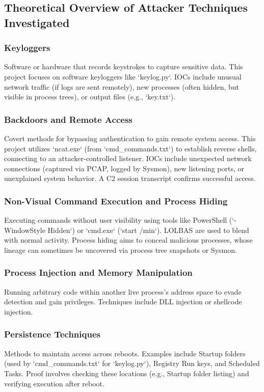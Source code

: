\documentclass[11pt]{article}
\begin{document}
	\subsection{Theoretical Overview of Attacker Techniques Investigated}
	\subsubsection{Keyloggers}
	Software or hardware that records keystrokes to capture sensitive data. This project focuses on software keyloggers like `keylog.py`. IOCs include unusual network traffic (if logs are sent remotely), new processes (often hidden, but visible in process trees), or output files (e.g., `key.txt`).
	\subsubsection{Backdoors and Remote Access}
	Covert methods for bypassing authentication to gain remote system access. This project utilizes `ncat.exe` (from `cmd_commands.txt`) to establish reverse shells, connecting to an attacker-controlled listener. IOCs include unexpected network connections (captured via PCAP, logged by Sysmon), new listening ports, or unexplained system behavior. A C2 session transcript confirms successful access.
	\subsubsection{Non-Visual Command Execution and Process Hiding}
	Executing commands without user visibility using tools like PowerShell (`-WindowStyle Hidden`) or `cmd.exe` (`start /min`). LOLBAS are used to blend with normal activity. Process hiding aims to conceal malicious processes, whose lineage can sometimes be uncovered via process tree snapshots or Sysmon.
	\subsubsection{Process Injection and Memory Manipulation}
	Running arbitrary code within another live process's address space to evade detection and gain privileges. Techniques include DLL injection or shellcode injection.
	\subsubsection{Persistence Techniques}
	Methods to maintain access across reboots. Examples include Startup folders (used by `cmd_commands.txt` for `keylog.py`), Registry Run keys, and Scheduled Tasks. Proof involves checking these locations (e.g., Startup folder listing) and verifying execution after reboot.
	
\end{document}

